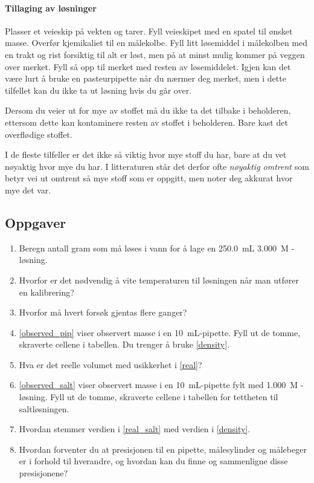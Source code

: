 \documentclass[hidelinks,12pt,norsk,a4paper,fleqn]{scrartcl}
\begin{document}
	\paragraph{Tillaging av løsninger}
	Plasser et veieskip på vekten og tarer. Fyll veieskipet med en spatel til ønsket masse. Overfør kjemikaliet til en målekolbe. Fyll litt løsemiddel i målekolben med en trakt og rist forsiktig til alt er løst, men på at minst mulig kommer på veggen over merket. Fyll så opp til merket med resten av løsemiddelet. Igjen kan det være lurt å bruke en pasteurpipette når du nærmer deg merket, men i dette tilfellet kan du ikke ta ut løsning hvis du går over.
	
	Dersom du veier ut for mye av stoffet må du ikke ta det tilbake i beholderen, ettersom dette kan kontaminere resten av stoffet i beholderen. Bare kast det overflødige stoffet.
	
	I de fleste tilfeller er det ikke så viktig hvor mye stoff du har, bare at du vet nøyaktig hvor mye du har. I litteraturen står det derfor ofte \emph{nøyaktig omtrent} som betyr vei ut omtrent så mye stoff som er oppgitt, men noter deg akkurat hvor mye det var.
	
	\subsection{Oppgaver}
	\begin{enumerate}[label=\alph*)]
		\item Beregn antall gram  som må løses i vann for å lage en \SI{250.0}{mL} \SI{3.000}{M} -løsning.\label{exercise}
		
		\item Hvorfor er det nødvendig å vite temperaturen til løsningen når man utfører en kalibrering?
		
		\item Hvorfor må hvert forsøk gjentas flere ganger?
		
		\item \cref{observed_pip} viser observert masse i en \SI{10}{mL}-pipette. Fyll ut de tomme, skraverte cellene i tabellen. Du trenger å bruke \cref{density}. \label{real} 
		
		\item Hva er det reelle volumet med usikkerhet i \ref{real}?
		
		\item \cref{observed_salt} viser observert masse i en \SI{10}{mL}-pipette fylt med \SI{1.000}{M} -løsning. Fyll ut de tomme, skraverte cellene i tabellen for tettheten til saltløsningen. \label{real_salt} 
		
		\item Hvordan stemmer verdien i \ref{real_salt} med verdien i \cref{density}.
		
		\item Hvordan forventer du at presisjonen til en pipette, målesylinder og målebeger er i forhold til hverandre, og hvordan kan du finne og sammenligne disse presisjonene?	
			
	\end{enumerate}
\end{document}
